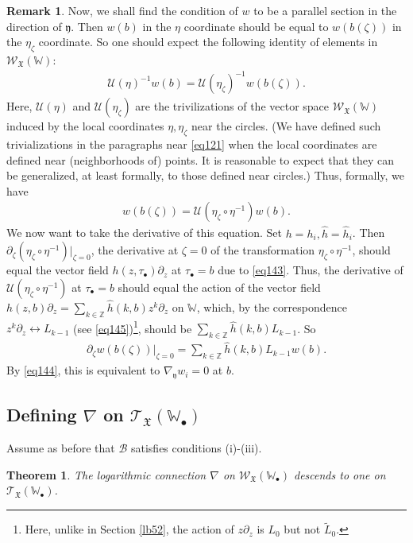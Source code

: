 \documentclass[12pt,a4paper,notitlepage]{report}
\theoremstyle{definition}
\newtheorem{rem}[df]{Remark}
\theoremstyle{plain}
\newtheorem{thm}[df]{Theorem}
\newcommand{\fk}{\mathfrak}
\newcommand{\mc}{\mathcal}
\newcommand{\wtd}{\widetilde}
\newcommand{\wht}{\widehat}
\newcommand{\scr}{\mathscr}
\newcommand{\yk}{\mathfrak y}
\newcommand{\blt}{\bullet}
\newcommand{\Wbb}{\mathbb W}
\newcommand{\Zbb}{\mathbb Z}
\numberwithin{equation}{section}
\begin{document}
\begin{rem}
Now, we shall find the condition of $w$ to be a parallel section in the direction of $\yk$. Then $w(b)$ in the $\eta$ coordinate should be equal to $w(b(\zeta))$ in the $\eta_\zeta$ coordinate. So one should expect the following identity of elements in $\scr W_{\fk X}(\Wbb)$:
\begin{align*}
\mc U(\eta)^{-1}w(b)=\mc U(\eta_\zeta)^{-1}w(b(\zeta)).
\end{align*}
Here, $\mc U(\eta)$ and $\mc U(\eta_\zeta)$ are the trivilizations of the vector space $\scr W_{\fk X}(\Wbb)$ induced by the local coordinates $\eta,\eta_\zeta$ near the circles. (We have defined such trivializations in the paragraphs near \eqref{eq121} when the local coordinates are defined near (neighborhoods of) points. It is reasonable to expect that they can be generalized, at least formally, to those defined near circles.) Thus, formally, we have
\begin{align*}
w(b(\zeta))=\mc U(\eta_\zeta\circ\eta^{-1})w(b).
\end{align*}
We now want to take the derivative of this equation. Set $h=h_i,\wht h=\wht h_i$. Then $\partial_\zeta(\eta_\zeta\circ\eta^{-1})|_{\zeta=0}$, the derivative at $\zeta=0$ of the transformation $\eta_\zeta\circ\eta^{-1}$, should equal the vector field $h(z,\tau_\blt)\partial_z$ at $\tau_\blt=b$ due to \eqref{eq143}.  Thus, the derivative of $\mc U(\eta_\zeta\circ\eta^{-1})$ at $\tau_\blt=b$ should equal the action of the vector field $h(z,b)\partial_z=\sum_{k\in\Zbb}\wht h(k,b)z^k\partial_z$ on $\Wbb$, which, by the correspondence $z^k\partial_z\leftrightarrow L_{k-1}$ (see \eqref{eq145})\footnote{Here, unlike in Section \ref{lb52}, the action of $z\partial_z$ is $L_0$ but not $\wtd L_0$.}, should be 
$\sum_{k\in\Zbb}\wht h(k,b)L_{k-1}$. So
\begin{align*}
\partial_\zeta w(b(\zeta))\Big|_{\zeta=0}=\sum_{k\in\Zbb}\wht h(k,b)L_{k-1}w(b).
\end{align*}
By \eqref{eq144}, this is equivalent to $\nabla_{\yk}w_i=0$ at $b$.
\end{rem}



\subsection*{Defining $\nabla$ on $\scr T_{\fk X}(\Wbb_\blt)$}

Assume as before that $\mc B$ satisfies conditions (i)-(iii).
\begin{thm}
The logarithmic connection $\nabla$ on $\scr W_{\fk X}(\Wbb_\blt)$ descends to one on $\scr T_{\fk X}(\Wbb_\blt)$.
\end{thm}
\end{document}
